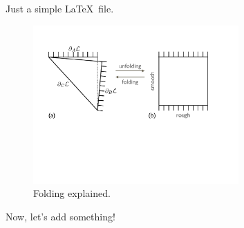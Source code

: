 \documentclass[preprint,showpacs,nofootinbib,floatfix]{revtex4-1}
\begin{document}
Just a simple \LaTeX\ file.


\vspace*{-5pt}
\begin{figure}[h!]
\includegraphics[width=0.70\textwidth]{fig_fold2}
\vspace*{-5pt}
\caption{Folding explained.}
\label{fig_folding} 
\end{figure} 


Now, let's add something!
\end{document}
